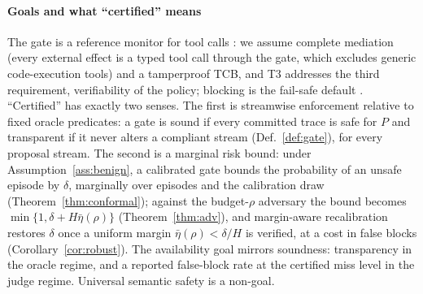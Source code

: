 \paragraph{Goals and what ``certified'' means}
The gate is a reference monitor for tool calls \citep{anderson1972planning}: we assume
complete mediation (every external effect is a typed tool call through the gate, which
excludes generic code-execution tools) and a tamperproof TCB, and T3 addresses the third
requirement, verifiability of the policy; blocking is the fail-safe default
\citep{saltzer1975protection}. ``Certified'' has exactly two senses. The first is streamwise
enforcement relative to fixed oracle predicates: a gate is sound if every committed trace is
safe for $P$ and transparent if it never alters a compliant stream (Def.~\ref{def:gate}),
for every proposal stream. The second is a marginal risk bound: under
Assumption~\ref{ass:benign}, a calibrated gate bounds the probability of an unsafe episode by
$\delta$, marginally over episodes and the calibration draw (Theorem~\ref{thm:conformal});
against the budget-$\rho$ adversary the bound becomes \mbox{$\min\{1,\delta+H\bar\eta(\rho)\}$}
(Theorem~\ref{thm:adv}), and margin-aware recalibration restores $\delta$ once a uniform
margin $\bar\eta(\rho)<\delta/H$ is verified, at a cost in false blocks
(Corollary~\ref{cor:robust}). The availability goal mirrors soundness: transparency in the
oracle regime, and a reported false-block rate at the certified miss level in the judge
regime. Universal semantic safety is a non-goal.
